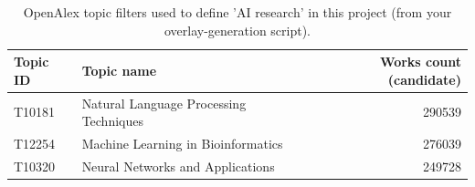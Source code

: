 \begin{table}[ht]
\centering
\begin{tabular}{llr}
\toprule
Topic ID & Topic name & Works count (candidate) \\
\midrule
T10181 & Natural Language Processing Techniques & 290539 \\
T12254 & Machine Learning in Bioinformatics & 276039 \\
T10320 & Neural Networks and Applications & 249728 \\
\bottomrule
\end{tabular}
\caption{OpenAlex topic filters used to define 'AI research' in this project (from your overlay-generation script).}
\label{tab:topics}
\end{table}

